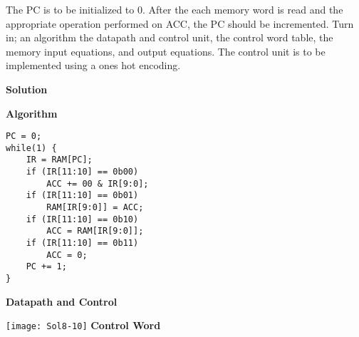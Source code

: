 \begin{enumerate}
        The PC is to be initialized to 0.  After the each memory word is read
        and the appropriate operation performed on ACC, the PC should be
        incremented.
        Turn in; an algorithm the datapath and control unit, the control word
        table, the memory input equations, and output equations.
        The control unit is to be implemented using a ones hot encoding.

        \begin{onlysolution}[fragile]  \textbf{Solution}\par
            \textbf{ Algorithm}
              \begin{verbatim}
PC = 0;
while(1) {
    IR = RAM[PC];
    if (IR[11:10] == 0b00)
        ACC += 00 & IR[9:0];
    if (IR[11:10] == 0b01)
        RAM[IR[9:0]] = ACC;
    if (IR[11:10] == 0b10)
        ACC = RAM[IR[9:0]];
    if (IR[11:10] == 0b11)
        ACC = 0;
    PC += 1;
}
\end{verbatim}
            \textbf{Datapath and Control}\par
            \texttt{[image: Sol8-10]}
            \textbf{Control Word}\vspace{0.5em}


\end{onlysolution}
\end{enumerate}
